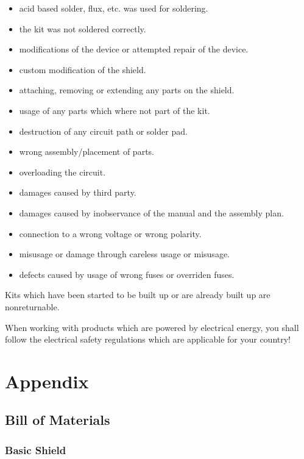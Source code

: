 \documentclass[fleqn,10pt]{SelfArx} %
\begin{document}
\begin{itemize}[noitemsep] %
\item acid based solder, flux, etc. was used for soldering.
\item the kit was not soldered correctly.
\item modifications of the device or attempted repair of the device.
\item custom modification of the shield.
\item attaching, removing or extending any parts on the shield.
\item usage of any parts which where not part of the kit.
\item destruction of any circuit path or solder pad.
\item wrong assembly/placement of parts.
\item overloading the circuit.
\item damages caused by third party.
\item damages caused by inobservance of the manual and the assembly plan.
\item connection to a wrong voltage or wrong polarity.
\item misusage or damage through careless usage or misusage.
\item defects caused by usage of wrong fuses or overriden fuses.
\end{itemize}

Kits which have been started to be built up or are already built up are nonreturnable.

When working with products which are powered by electrical energy, you shall follow the electrical safety regulations which are  applicable for your country!


\section{Appendix}

\subsection*{Bill of Materials}

\subsubsection*{Basic Shield}
\end{document}
